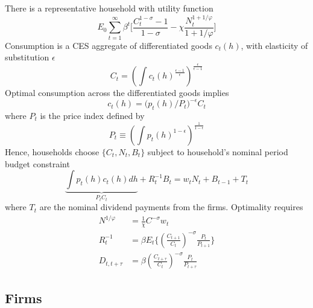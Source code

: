 \documentclass[a4paper,10pt]{article}  %
\begin{document}
There is a representative household with utility function
\begin{equation}
   \label{eq:utility}
   E_0 \sum_{t=1}^{\infty} \beta^t \bigg[ \frac{ C_t^{1-\sigma} -1}{ 1-\sigma } - \chi \frac{ N_t^{1+ 1/\varphi} }{ 1+ 1/\varphi } \bigg]   
\end{equation}
Consumption is a CES aggregate of differentiated goods $c_t(h)$, with elasticity of substitution $ \epsilon $
\[
   C_t = \left( \int c_t(h)^{ \frac{\epsilon-1}{\epsilon} }  \right)^{\frac{\epsilon}{ \epsilon -1 }  }
\] 
Optimal consumption across the differentiated goods implies
\begin{equation}
   \label{eq:demand_cons}
   c_t(h) = \big(p_t(h)/P_t \big)^{- \epsilon} C_t 
\end{equation}
where $ P_t $ is the price index defined by
\begin{equation}
   \label{eq:price_index}
   P_t \equiv \left( \int p_t(h)^{1-\epsilon} \right)^{ \frac{1}{1-\epsilon} } 
\end{equation}
Hence, households choose $ \big\{ C_t, N_t, B_t\big\} $ subject to household's nominal period budget constraint
\[
   \underbrace{\int p_t(h) c_t(h)dh}_{P_t C_t} + R_t^{-1} B_t= w_t N_t + B_{t-1}+T_t
\]
where $ T_t $ are the nominal dividend payments from the firms. Optimality requires
\begin{align}
   N^{1/\varphi} & = \frac{1}{\chi} C^{-\sigma} w_t  \\
   R_{t}^{-1}    & = \beta E_t \Bigg\{ \left(\frac{C_{t+1}}{C_{t}}\right)^{-\sigma} \frac{P_t}{ P_{t+1} } \Bigg\} \\
   D_{t,t+\tau}  & =  \beta \left(\frac{C_{t+\tau}}{C_{t}}\right)^{-\sigma} \frac{P_t}{ P_{t+\tau} }
\end{align}


\subsection{Firms} %
\label{sub:firms}
\end{document}
